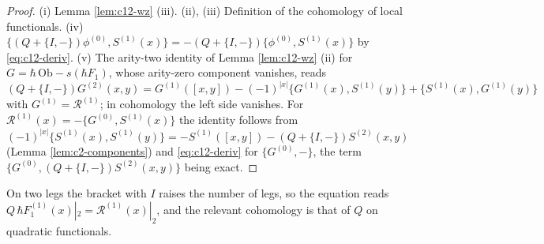 \begin{proof}
(i) Lemma \ref{lem:c12-wz} (iii). (ii), (iii) Definition of the cohomology of local functionals. (iv) $\{(Q+\{I,-\})\phi^{(0)},S^{(1)}(x)\}=-(Q+\{I,-\})\{\phi^{(0)},S^{(1)}(x)\}$ by \eqref{eq:c12-deriv}. (v) The arity-two identity of Lemma \ref{lem:c12-wz} (ii) for $G=\hbar\,\mathrm{Ob}-s(\hbar F_1)$, whose arity-zero component vanishes, reads $(Q+\{I,-\})G^{(2)}(x,y)=G^{(1)}([x,y])-(-1)^{|x|}\{G^{(1)}(x),S^{(1)}(y)\}+\{S^{(1)}(x),G^{(1)}(y)\}$ with $G^{(1)}=\mathcal R^{(1)}$; in cohomology the left side vanishes. For $\mathcal R^{(1)}(x)=-\{G^{(0)},S^{(1)}(x)\}$ the identity follows from $(-1)^{|x|}\{S^{(1)}(x),S^{(1)}(y)\}=-S^{(1)}([x,y])-(Q+\{I,-\})S^{(2)}(x,y)$ (Lemma \ref{lem:c2-components}) and \eqref{eq:c12-deriv} for $\{G^{(0)},-\}$, the term $\{G^{(0)},(Q+\{I,-\})S^{(2)}(x,y)\}$ being exact.
\end{proof}

On two legs the bracket with $I$ raises the number of legs, so the equation reads $Q\,\hbar F_1^{(1)}(x)|_2=\mathcal R^{(1)}(x)|_2$, and the relevant cohomology is that of $Q$ on quadratic functionals.

